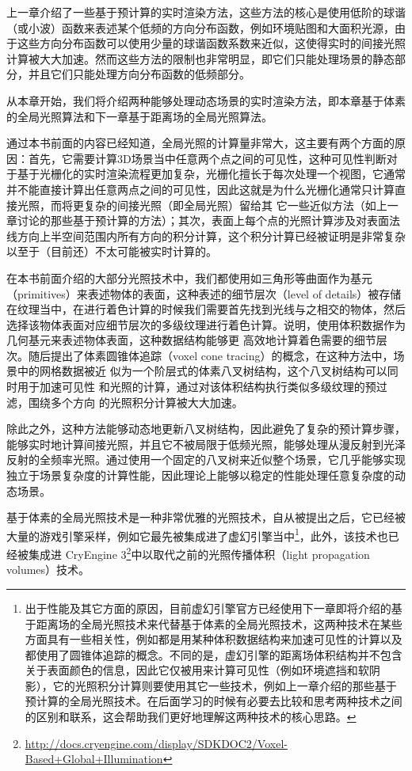 上一章介绍了一些基于预计算的实时渲染方法，这些方法的核心是使用低阶的球谐（或小波）函数来表述某个低频的方向分布函数，例如环境贴图和大面积光源，由于这些方向分布函数可以使用少量的球谐函数系数来近似，这使得实时的间接光照计算被大大加速。然而这些方法的限制也非常明显，即它们只能处理场景的静态部分，并且它们只能处理方向分布函数的低频部分。

从本章开始，我们将介绍两种能够处理动态场景的实时渲染方法，即本章基于体素的全局光照算法和下一章基于距离场的全局光照算法。

通过本书前面的内容已经知道，全局光照的计算量非常大，这主要有两个方面的原因：首先，它需要计算3D场景当中任意两个点之间的可见性，这种可见性判断对于基于光栅化的实时渲染流程更加复杂，光栅化擅长于每次处理一个视图，它通常并不能直接计算出任意两点之间的可见性，因此这就是为什么光栅化通常只计算直接光照，而将更复杂的间接光照（即全局光照）留给其 它一些近似方法（如上一章讨论的那些基于预计算的方法）；其次，表面上每个点的光照计算涉及对表面法线方向上半空间范围内所有方向的积分计算，这个积分计算已经被证明是非常复杂以至于（目前还）不太可能被实时计算的。

在本书前面介绍的大部分光照技术中，我们都使用如三角形等曲面作为基元（primitives）来表述物体的表面，这种表述的细节层次（level of details）被存储在纹理当中，在进行着色计算的时候我们需要首先找到光线与之相交的物体，然后选择该物体表面对应细节层次的多级纹理进行着色计算。\cite{a:GigaVoxels:RayGuidedStreamingforEfficientandDetailedVoxelRendering}说明，使用体积数据作为几何基元来表述物体表面，这种数据结构能够更 高效地计算着色需要的细节层次。随后\cite{a:InteractiveIndirectIlluminationUsingVoxelConeTracing}提出了体素圆锥体追踪（voxel cone tracing）的概念，在这种方法中，场景中的网格数据被近 似为一个阶层式的体素八叉树结构，这个八叉树结构可以同时用于加速可见性 和光照的计算，通过对该体积结构执行类似多级纹理的预过滤，围绕多个方向 的光照积分计算被大大加速。

除此之外，这种方法能够动态地更新八叉树结构，因此避免了复杂的预计算步骤，能够实时地计算间接光照，并且它不被局限于低频光照，能够处理从漫反射到光泽反射的全频率光照。通过使用一个固定的八叉树来近似整个场景，它几乎能够实现独立于场景复杂度的计算性能，因此理论上能够以稳定的性能处理任意复杂度的动态场景。

基于体素的全局光照技术是一种非常优雅的光照技术，自从被提出之后，它已经被大量的游戏引擎采样，例如它最先被集成进了虚幻引擎\cite{a:TheTechnologyBehindtheUnrealEngine4Elementaldemo}当中\footnote{出于性能及其它方面的原因，目前虚幻引擎官方已经使用下一章即将介绍的基于距离场的全局光照技术来代替基于体素的全局光照技术，这两种技术在某些方面具有一些相关性，例如都是用某种体积数据结构来加速可见性的计算以及都使用了圆锥体追踪的概念。不同的是，虚幻引擎的距离场体积结构并不包含关于表面颜色的信息，因此它仅被用来计算可见性（例如环境遮挡和软阴影），它的光照积分计算则要使用其它一些技术，例如上一章介绍的那些基于预计算的全局光照技术。在后面学习的时候有必要去比较和思考两种技术之间的区别和联系，这会帮助我们更好地理解这两种技术的核心思路。}，此外，该技术也已经被集成进 CryEngine 3\footnote{\url{http://docs.cryengine.com/display/SDKDOC2/Voxel-Based+Global+Illumination}}中以取代之前的光照传播体积（light propagation volumes）技术。



